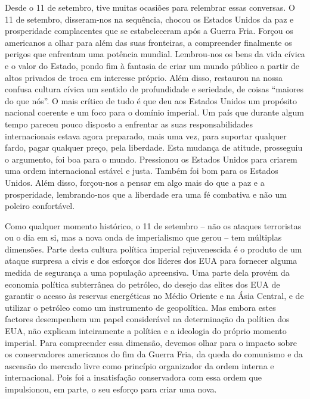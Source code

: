  
\par
 
Desde o 11 de setembro, tive muitas ocasiões para relembrar essas conversas. O 11 de setembro, disseram-nos na sequência, chocou os Estados Unidos da paz e prosperidade complacentes que se estabeleceram após a Guerra Fria. Forçou os americanos a olhar para além das suas fronteiras, a compreender finalmente os perigos que enfrentam uma potência mundial. Lembrou-nos os bens da vida cívica e o valor do Estado, pondo fim à fantasia de criar um mundo público a partir de altos privados de troca em interesse próprio. Além disso, restaurou na nossa confusa cultura cívica um sentido de profundidade e seriedade, de coisas “maiores do que nós”. O mais crítico de tudo é que deu aos Estados Unidos um propósito nacional coerente e um foco para o domínio imperial. Um país que durante algum tempo pareceu pouco disposto a enfrentar as suas responsabilidades internacionais estava agora preparado, mais uma vez, para suportar qualquer fardo, pagar qualquer preço, pela liberdade. Esta mudança de atitude, prosseguiu o argumento, foi boa para o mundo. Pressionou os Estados Unidos para criarem uma ordem internacional estável e justa. Também foi bom para os Estados Unidos. Além disso, forçou-nos a pensar em algo mais do que a paz e a prosperidade, lembrando-nos que a liberdade era uma fé combativa e não um poleiro confortável.
 
\par
 
Como qualquer momento histórico, o 11 de setembro – não os ataques terroristas ou o dia em si, mas a nova onda de imperialismo que gerou – tem múltiplas dimensões. Parte desta cultura política imperial rejuvenescida é o produto de um ataque surpresa a civis e dos esforços dos líderes dos EUA para fornecer alguma medida de segurança a uma população apreensiva. Uma parte dela provém da economia política subterrânea do petróleo, do desejo das elites dos EUA de garantir o acesso às reservas energéticas no Médio Oriente e na Ásia Central, e de utilizar o petróleo como um instrumento de geopolítica. Mas embora estes factores desempenhem um papel considerável na determinação da política dos EUA, não explicam inteiramente a política e a ideologia do próprio momento imperial. Para compreender essa dimensão, devemos olhar para o impacto sobre os conservadores americanos do fim da Guerra Fria, da queda do comunismo e da ascensão do mercado livre como princípio organizador da ordem interna e internacional. Pois foi a insatisfação conservadora com essa ordem que impulsionou, em parte, o seu esforço para criar uma nova.
 
